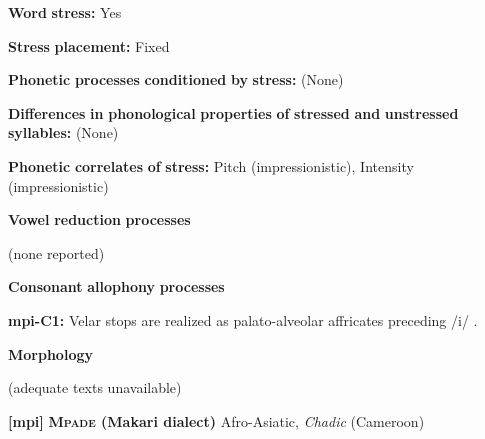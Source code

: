 \documentclass[output=paper]{langsci/langscibook}
\begin{document}
\begin{styleBody}
\textbf{Word} \textbf{stress:} Yes
\end{styleBody}

\begin{styleBody}
\textbf{Stress} \textbf{placement:} Fixed
\end{styleBody}

\begin{styleBody}
\textbf{Phonetic} \textbf{processes} \textbf{conditioned} \textbf{by} \textbf{stress:} (None)
\end{styleBody}

\begin{styleBody}
\textbf{Differences} \textbf{in} \textbf{phonological} \textbf{properties} \textbf{of} \textbf{stressed} \textbf{and} \textbf{unstressed} \textbf{syllables:} (None)
\end{styleBody}

\begin{styleBody}
\textbf{Phonetic} \textbf{correlates} \textbf{of} \textbf{stress:} Pitch (impressionistic), Intensity (impressionistic)
\end{styleBody}

\begin{styleBody}
\textbf{Vowel} \textbf{reduction} \textbf{processes}
\end{styleBody}

\begin{styleBody}
(none reported)
\end{styleBody}

\begin{styleBody}
\textbf{Consonant} \textbf{allophony} \textbf{processes}
\end{styleBody}

\begin{styleBody}
\textbf{mpi-C1:} Velar stops are realized as palato-alveolar affricates preceding /i/ \citep{Allison2012}.
\end{styleBody}

\begin{styleBody}
\textbf{Morphology}
\end{styleBody}

\begin{styleBody}
(adequate texts unavailable)
\end{styleBody}

\begin{styleBody}
\textbf{[mpi]}   \textbf{\textsc{Mpade} \textbf{(Makari} \textbf{dialect)}}  Afro-Asiatic, \textit{Chadic} (Cameroon)
\end{styleBody}
\end{document}
